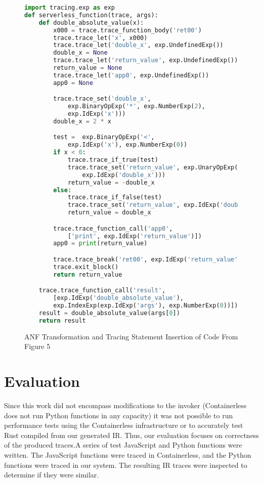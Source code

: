 \documentclass[acmsmall,review,authorversion]{acmart}
\begin{document}
\begin{figure}[H]
    \centering
    \begin{lstlisting}[language=Python]
import tracing.exp as exp
def serverless_function(trace, args):
    def double_absolute_value(x):
        x000 = trace.trace_function_body('ret00')
        trace.trace_let('x', x000)
        trace.trace_let('double_x', exp.UndefinedExp())
        double_x = None
        trace.trace_let('return_value', exp.UndefinedExp())
        return_value = None
        trace.trace_let('app0', exp.UndefinedExp())
        app0 = None

        trace.trace_set('double_x',
            exp.BinaryOpExp('*', exp.NumberExp(2),
            exp.IdExp('x')))
        double_x = 2 * x

        test =  exp.BinaryOpExp('<',
            exp.IdExp('x'), exp.NumberExp(0))
        if x < 0:
            trace.trace_if_true(test)
            trace.trace_set('return_value', exp.UnaryOpExp('-',
                exp.IdExp('double_x')))
            return_value = -double_x
        else:
            trace.trace_if_false(test)
            trace.trace_set('return_value', exp.IdExp('double_x'))
            return_value = double_x

        trace.trace_function_call('app0',
            ['print', exp.IdExp('return_value')])
        app0 = print(return_value)

        trace.trace_break('ret00', exp.IdExp('return_value'))
        trace.exit_block()
        return return_value

    trace.trace_function_call('result',
        [exp.IdExp('double_absolute_value'),
        exp.IndexExp(exp.IdExp('args'), exp.NumberExp(0))])
    result = double_absolute_value(args[0])
    return result
    \end{lstlisting}
    \caption{ANF Transformation and Tracing Statement Insertion of Code From Figure 5}
    \label{fig:my_label}
\end{figure}

\section{Evaluation}
\label{section:evaluation}

Since this work did not encompass modifications to the invoker (Containerless does not run Python functions in any capacity) it was not possible to run performance tests using the Containerless infrastructure or to accurately test Rust compiled from our generated IR. Thus, our evaluation focuses on correctness of the produced traces.A series of test JavaScript and Python functions were written. The JavaScript functions were traced in Containerless, and the Python functions were traced in our system. The resulting IR traces were inspected to determine if they were similar.
\end{document}
